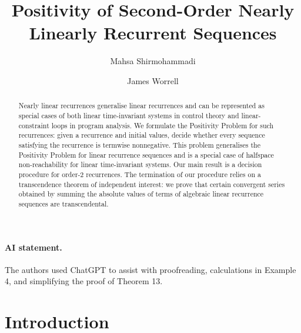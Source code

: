 \documentclass[a4paper,UKenglish,cleveref, autoref, thm-restate]{lipics-v2021}
\title{Positivity of Second-Order Nearly Linearly Recurrent Sequences}
\author{Mahsa Shirmohammadi}{CNRS, IRIF, Universit\'{e} Paris
  Cit\'{e}, Paris, France}{mahsa@irif.fr}
{https://orcid.org/0000-0002-7779-2339}{}
\author{James Worrell}{Department of Computer Science, University of Oxford, UK}{jbw@cs.ox.ac.uk}
{https://orcid.org/0000-0001-8151-2443}{}
\begin{document}
\maketitle

\begin{abstract}
Nearly linear recurrences generalise linear recurrences and can be represented as special cases of both linear time-invariant systems in control theory and linear-constraint loops in program analysis. We formulate the Positivity Problem for such recurrences: given a recurrence and initial values, decide whether every sequence satisfying the recurrence is termwise nonnegative. This problem generalises the Positivity Problem for linear recurrence sequences and is a special case of halfspace non-reachability for linear time-invariant systems. Our main result is a decision procedure for order-2 recurrences. The termination of our procedure relies on a transcendence theorem of independent interest: we prove that certain convergent series obtained by summing the absolute values of terms of algebraic linear recurrence sequences are transcendental.
\end{abstract}

\paragraph*{AI statement.}
The authors used ChatGPT to assist with proofreading, calculations in Example 4, and simplifying the proof of Theorem 13.


\section{Introduction}
\end{document}
